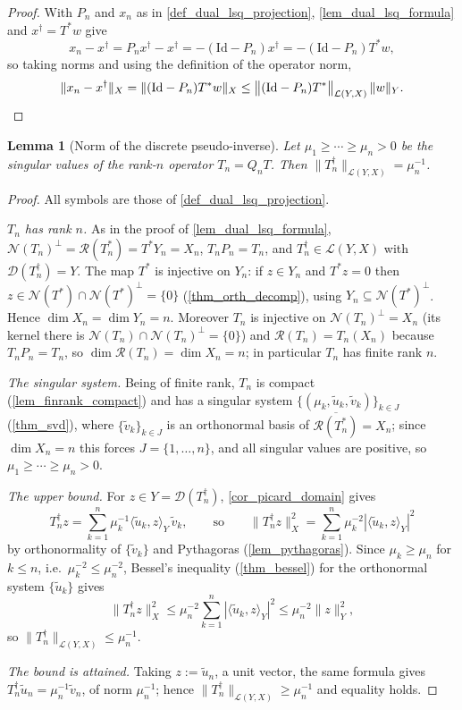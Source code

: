 \documentclass[a4paper]{report}
\theoremstyle{plain}
\newtheorem{lemma}[theorem]{Lemma}
\theoremstyle{definition}
\theoremstyle{remark}
\newcommand{\Ll}{\mathcal{L}}
\newcommand{\Ran}{\mathcal{R}}
\newcommand{\Ker}{\mathcal{N}}
\newcommand{\Dom}{\mathcal{D}}
\newcommand{\Id}{\mathrm{Id}}
\newcommand{\dg}{^{\dagger}}
\begin{document}
\begin{proof}
  With $P_n$ and $x_n$ as in \cref{def_dual_lsq_projection},
  \cref{lem_dual_lsq_formula} and $x\dg = T^{*}w$ give
  \[
    x_n - x\dg = P_nx\dg - x\dg = -(\Id - P_n)x\dg = -(\Id - P_n)T^{*}w ,
  \]
  so taking norms and using the definition of the operator norm,
  \[
    \|x_n - x\dg\|_X = \|(\Id - P_n)T^{*}w\|_X
      \le \bigl\|(\Id - P_n)T^{*}\bigr\|_{\Ll(Y,X)}\,\|w\|_Y . \qedhere
  \]
\end{proof}


\begin{lemma}[Norm of the discrete pseudo-inverse]
  \label{lem_discrete_opnorm}
  Let $\mu_1 \ge \cdots \ge \mu_n > 0$ be the singular values of the rank-$n$ operator
  $T_n = Q_n T$.  Then $\|T_n\dg\|_{\Ll(Y,X)} = \mu_n^{-1}$.
\end{lemma}

\begin{proof}
  All symbols are those of \cref{def_dual_lsq_projection}.

  \emph{$T_n$ has rank $n$.}  As in the proof of \cref{lem_dual_lsq_formula},
  $\Ker(T_n)^{\perp} = \Ran(T_n^{*}) = T^{*}Y_n = X_n$, $T_nP_n = T_n$, and
  $T_n\dg \in \Ll(Y,X)$ with $\Dom(T_n\dg) = Y$.  The map $T^{*}$ is injective on $Y_n$:
  if $z \in Y_n$ and $T^{*}z = 0$ then $z \in \Ker(T^{*}) \cap \Ker(T^{*})^{\perp} = \{0\}$
  (\cref{thm_orth_decomp}), using $Y_n \subseteq \Ker(T^{*})^{\perp}$.  Hence
  $\dim X_n = \dim Y_n = n$.  Moreover $T_n$ is injective on $\Ker(T_n)^{\perp} = X_n$
  (its kernel there is $\Ker(T_n) \cap \Ker(T_n)^{\perp} = \{0\}$) and
  $\Ran(T_n) = T_n(X_n)$ because $T_nP_n = T_n$, so
  $\dim\Ran(T_n) = \dim X_n = n$; in particular $T_n$ has finite rank $n$.

  \emph{The singular system.}  Being of finite rank, $T_n$ is compact
  (\cref{lem_finrank_compact}) and has a singular system
  $\{(\mu_k,\tilde{u}_k,\tilde{v}_k)\}_{k \in J}$ (\cref{thm_svd}), where
  $\{\tilde{v}_k\}_{k \in J}$ is an orthonormal basis of
  $\overline{\Ran(T_n^{*})} = X_n$; since $\dim X_n = n$ this forces
  $J = \{1,\dots,n\}$, and all singular values are positive, so
  $\mu_1 \ge \cdots \ge \mu_n > 0$.

  \emph{The upper bound.}  For $z \in Y = \Dom(T_n\dg)$, \cref{cor_picard_domain} gives
  \[
    T_n\dg z = \sum_{k=1}^{n}\mu_k^{-1}\langle \tilde{u}_k, z\rangle_Y\,\tilde{v}_k ,
    \qquad\text{so}\qquad
    \|T_n\dg z\|_X^{2} = \sum_{k=1}^{n}\mu_k^{-2}|\langle\tilde{u}_k,z\rangle_Y|^{2}
  \]
  by orthonormality of $\{\tilde{v}_k\}$ and Pythagoras (\cref{lem_pythagoras}).  Since
  $\mu_k \ge \mu_n$ for $k \le n$, i.e.\ $\mu_k^{-2} \le \mu_n^{-2}$, Bessel's inequality
  (\cref{thm_bessel}) for the orthonormal system $\{\tilde{u}_k\}$ gives
  \[
    \|T_n\dg z\|_X^{2} \le \mu_n^{-2}\sum_{k=1}^{n}|\langle\tilde{u}_k,z\rangle_Y|^{2}
      \le \mu_n^{-2}\|z\|_Y^{2} ,
  \]
  so $\|T_n\dg\|_{\Ll(Y,X)} \le \mu_n^{-1}$.

  \emph{The bound is attained.}  Taking $z := \tilde{u}_n$, a unit vector, the same
  formula gives $T_n\dg\tilde{u}_n = \mu_n^{-1}\tilde{v}_n$, of norm $\mu_n^{-1}$; hence
  $\|T_n\dg\|_{\Ll(Y,X)} \ge \mu_n^{-1}$ and equality holds.
\end{proof}
\end{document}
